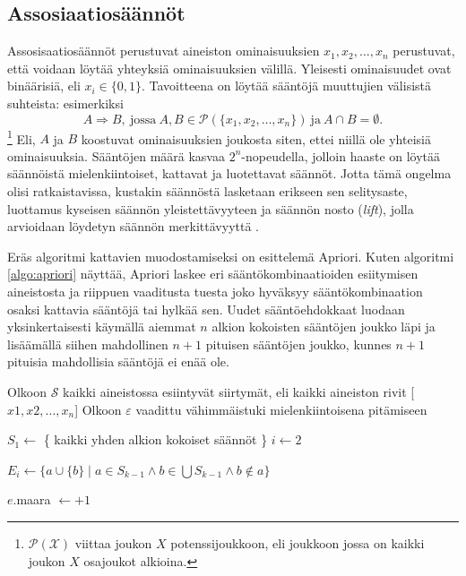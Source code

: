 \documentclass[finnish,gradu,twoside,12pt]{tktltiki}
\begin{document}
{\subsection{Assosiaatiosäännöt}

Assosisaatiosäännöt perustuvat aineiston ominaisuuksien $x_1, x_2, \ldots, x_n$ perustuvat, että voidaan löytää yhteyksiä ominaisuuksien välillä. Yleisesti ominaisuudet ovat binäärisiä, eli $x_i \in \{ 0, 1\}$. Tavoitteena on löytää sääntöjä muuttujien välisistä suhteista: esimerkiksi $$A \Rightarrow B, \mathrm{~jossa~} A, B \in \mathcal{P}( \{ x_1, x_2, \ldots , x_n \} ) \mathrm{~ja~} A \cap B = \emptyset.$$\footnote{$\mathcal{P(X)}$ viittaa joukon $X$ potenssijoukkoon, eli joukkoon jossa on kaikki joukon $X$ osajoukot alkioina.} Eli, $A$ ja $B$ koostuvat ominaisuuksien joukosta siten, ettei niillä ole yhteisiä ominaisuuksia. Sääntöjen määrä kasvaa $2^n$-nopeudella, jolloin haaste on löytää säännöistä mielenkiintoiset, kattavat ja luotettavat säännöt. Jotta tämä ongelma olisi ratkaistavissa, kustakin säännöstä lasketaan erikseen sen selitysaste, luottamus kyseisen säännön yleistettävyyteen ja säännön nosto (\textit{lift}), jolla arvioidaan löydetyn säännön merkittävyyttä \citep[485--586]{Hastie2009}.

Eräs algoritmi kattavien muodostamiseksi on \citet{Agrawal1994a} esittelemä Apriori. Kuten algoritmi \ref{algo:apriori} näyttää, Apriori laskee eri sääntökombinaatioiden esiitymisen aineistosta ja riippuen vaaditusta tuesta joko hyväksyy sääntökombinaation osaksi kattavia sääntöjä tai hylkää sen. Uudet sääntöehdokkaat luodaan yksinkertaisesti käymällä aiemmat $n$ alkion kokoisten sääntöjen joukko läpi ja lisäämällä siihen mahdollinen $n+1$ pituisen sääntöjen joukko, kunnes $n+1$ pituisia mahdollisia sääntöjä ei enää ole.

\begin{algorithm}
\begin{algorithmic}
\State Olkoon $\mathcal{S}$ kaikki aineistossa esiintyvät siirtymät, eli kaikki aineiston rivit [$x1, x2, \ldots, x_n$]
\State Olkoon $\varepsilon$ vaadittu vähimmäistuki mielenkiintoisena pitämiseen

\State $S_1 \gets $ \{ kaikki yhden alkion kokoiset säännöt \}
\State $i \gets 2$


  \State $E_i \gets \{ a \cup \{b\} \mid a \in S_{k-1} \land b \in \bigcup S_{k-1} \land b \not \in a \} $

		   \State $e$.maara $ \gets + 1$
		\EndFor


\end{algorithmic}
\end{algorithm}}
\end{document}
